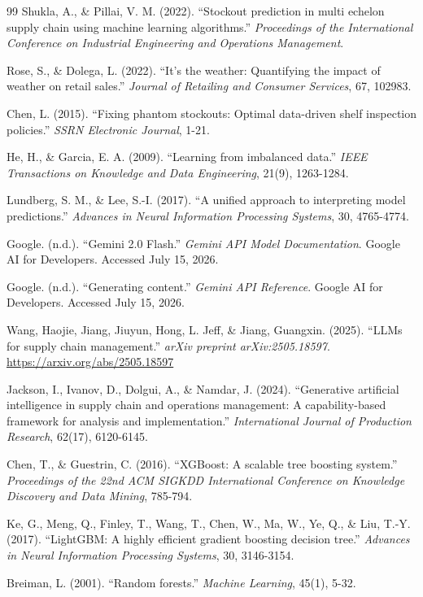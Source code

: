 \documentclass[11pt, a4paper]{article}
\begin{document}
\begin{thebibliography}{99}
Shukla, A., \& Pillai, V. M. (2022). ``Stockout prediction in multi echelon supply chain using machine learning algorithms.'' \textit{Proceedings of the International Conference on Industrial Engineering and Operations Management}.

Rose, S., \& Dolega, L. (2022). ``It's the weather: Quantifying the impact of weather on retail sales.'' \textit{Journal of Retailing and Consumer Services}, 67, 102983.

Chen, L. (2015). ``Fixing phantom stockouts: Optimal data-driven shelf inspection policies.'' \textit{SSRN Electronic Journal}, 1-21.

He, H., \& Garcia, E. A. (2009). ``Learning from imbalanced data.'' \textit{IEEE Transactions on Knowledge and Data Engineering}, 21(9), 1263-1284.

Lundberg, S. M., \& Lee, S.-I. (2017). ``A unified approach to interpreting model predictions.'' \textit{Advances in Neural Information Processing Systems}, 30, 4765-4774.

Google. (n.d.). ``Gemini 2.0 Flash.'' \textit{Gemini API Model Documentation}. Google AI for Developers. Accessed July 15, 2026.

Google. (n.d.). ``Generating content.'' \textit{Gemini API Reference}. Google AI for Developers. Accessed July 15, 2026.

Wang, Haojie, Jiang, Jiuyun, Hong, L. Jeff, \& Jiang, Guangxin. (2025). ``LLMs for supply chain management.'' \textit{arXiv preprint arXiv:2505.18597}. \url{https://arxiv.org/abs/2505.18597}

Jackson, I., Ivanov, D., Dolgui, A., \& Namdar, J. (2024). ``Generative artificial intelligence in supply chain and operations management: A capability-based framework for analysis and implementation.'' \textit{International Journal of Production Research}, 62(17), 6120-6145.

Chen, T., \& Guestrin, C. (2016). ``XGBoost: A scalable tree boosting system.'' \textit{Proceedings of the 22nd ACM SIGKDD International Conference on Knowledge Discovery and Data Mining}, 785-794.

Ke, G., Meng, Q., Finley, T., Wang, T., Chen, W., Ma, W., Ye, Q., \& Liu, T.-Y. (2017). ``LightGBM: A highly efficient gradient boosting decision tree.'' \textit{Advances in Neural Information Processing Systems}, 30, 3146-3154.

Breiman, L. (2001). ``Random forests.'' \textit{Machine Learning}, 45(1), 5-32.

\end{thebibliography}
\end{document}
